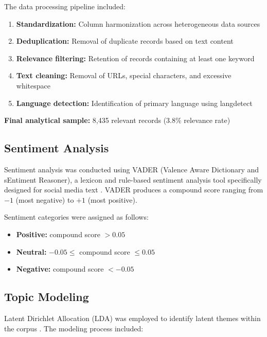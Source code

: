\documentclass[12pt,a4paper]{article}
\begin{document}
The data processing pipeline included:

\begin{enumerate}[leftmargin=*, itemsep=0.3em]
    \item \textbf{Standardization:} Column harmonization across heterogeneous data sources
    \item \textbf{Deduplication:} Removal of duplicate records based on text content
    \item \textbf{Relevance filtering:} Retention of records containing at least one keyword
    \item \textbf{Text cleaning:} Removal of URLs, special characters, and excessive whitespace
    \item \textbf{Language detection:} Identification of primary language using langdetect
\end{enumerate}

\textbf{Final analytical sample:} 8,435 relevant records (3.8\% relevance rate)

\subsection{Sentiment Analysis}

Sentiment analysis was conducted using VADER (Valence Aware Dictionary and sEntiment Reasoner), a lexicon and rule-based sentiment analysis tool specifically designed for social media text \citep{hutto2014vader}. VADER produces a compound score ranging from $-1$ (most negative) to $+1$ (most positive).

Sentiment categories were assigned as follows:
\begin{itemize}[leftmargin=*, itemsep=0.2em]
    \item \textbf{Positive:} compound score $> 0.05$
    \item \textbf{Neutral:} $-0.05 \leq$ compound score $\leq 0.05$
    \item \textbf{Negative:} compound score $< -0.05$
\end{itemize}

\subsection{Topic Modeling}

Latent Dirichlet Allocation (LDA) was employed to identify latent themes within the corpus \citep{blei2003latent}. The modeling process included:
\end{document}
